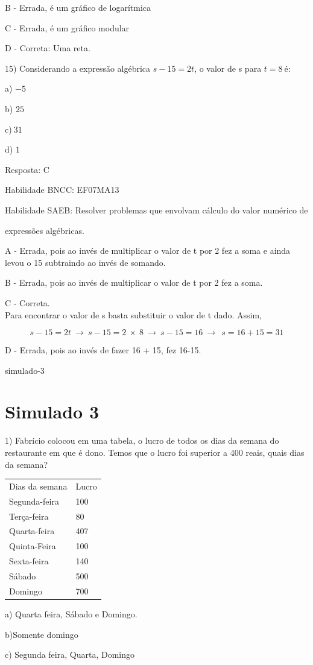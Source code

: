 {B - Errada, é um gráfico de logarítmica

C - Errada, é um gráfico modular

D - Correta: Uma reta.

15) Considerando a expressão algébrica \(s - 15 = 2t\), o valor de s
para \(t = 8\ \)é:

a) \(- 5\)

b) \(25\)

c)\(\ 31\)

d) \(1\)

Resposta: C

Habilidade BNCC: EF07MA13

Habilidade SAEB: Resolver problemas que envolvam cálculo do valor
numérico de

expressões algébricas.

A - Errada, pois ao invés de multiplicar o valor de t por 2 fez a soma e
ainda levou o 15 subtraindo ao invés de somando.

B - Errada, pois ao invés de multiplicar o valor de t por 2 fez a soma.

C - Correta.\\
Para encontrar o valor de s basta substituir o valor de t dado. Assim,

\[s - 15 = 2t\  \rightarrow \ s - 15 = 2\  \times \ 8\  \rightarrow \ s - 15 = 16\  \rightarrow \ \ s = 16 + 15 = 31\]

D - Errada, pois ao invés de fazer 16 + 15, fez 16-15.

simulado-3}{%
\section{Simulado 3}

1) Fabrício colocou em uma tabela, o lucro de todos os dias da semana do
restaurante em que é dono. Temos que o lucro foi superior a 400 reais,
quais dias da semana?

\begin{longtable}[]{@{}ll@{}}
\toprule
\endhead
Dias da semana & Lucro\tabularnewline
Segunda-feira & 100\tabularnewline
Terça-feira & 80\tabularnewline
Quarta-feira & 407\tabularnewline
Quinta-Feira & 100\tabularnewline
Sexta-feira & 140\tabularnewline
Sábado & 500\tabularnewline
Domingo & 700\tabularnewline
\bottomrule
\end{longtable}

a) Quarta feira, Sábado e Domingo.

b)Somente domingo

c) Segunda feira, Quarta, Domingo

}
